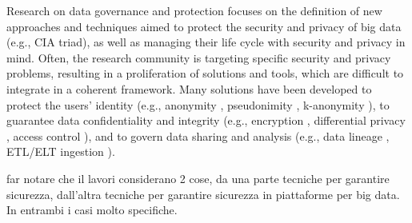 Research on data governance and protection focuses on the definition of new approaches and techniques aimed to protect the security and privacy of big data (e.g., CIA triad), as well as managing their life cycle with security and privacy in mind. Often, the research community is targeting specific security and privacy problems, resulting in a proliferation of solutions and tools, which are difficult to integrate in a coherent framework. Many solutions have been developed to protect the users' identity (e.g., anonymity \cite{wallace1999anonymity}, pseudonimity \cite{pfitzmann2001pseudonymity}, k-anonymity \cite{k-anon}), to guarantee data confidentiality and integrity (e.g., encryption \cite{thambiraja2012survey}, differential privacy \cite{hassan2019differential}, access control \cite{tolone2005access,servos2017current}), and to govern data sharing and analysis (e.g., data lineage \cite{woodruff1997supporting}, ETL/ELT ingestion \cite{vassiliadis2009survey}).


far notare che il lavori considerano 2 cose, da una parte tecniche per garantire sicurezza, dall'altra tecniche per garantire sicurezza in piattaforme per big data. In entrambi i casi molto specifiche.

